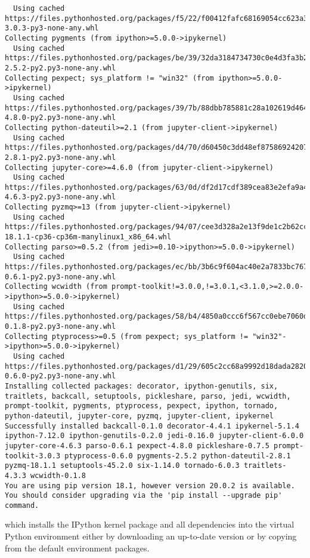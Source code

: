 \begin{verbatim}
  Using cached https://files.pythonhosted.org/packages/f5/22/f00412fafc68169054cc623a35c32773f22b403ddbe516c8adfdecf25341/prompt_toolkit-3.0.3-py3-none-any.whl
Collecting pygments (from ipython>=5.0.0->ipykernel)
  Using cached https://files.pythonhosted.org/packages/be/39/32da3184734730c0e4d3fa3b2b5872104668ad6dc1b5a73d8e477e5fe967/Pygments-2.5.2-py2.py3-none-any.whl
Collecting pexpect; sys_platform != "win32" (from ipython>=5.0.0->ipykernel)
  Using cached https://files.pythonhosted.org/packages/39/7b/88dbb785881c28a102619d46423cb853b46dbccc70d3ac362d99773a78ce/pexpect-4.8.0-py2.py3-none-any.whl
Collecting python-dateutil>=2.1 (from jupyter-client->ipykernel)
  Using cached https://files.pythonhosted.org/packages/d4/70/d60450c3dd48ef87586924207ae8907090de0b306af2bce5d134d78615cb/python_dateutil-2.8.1-py2.py3-none-any.whl
Collecting jupyter-core>=4.6.0 (from jupyter-client->ipykernel)
  Using cached https://files.pythonhosted.org/packages/63/0d/df2d17cdf389cea83e2efa9a4d32f7d527ba78667e0153a8e676e957b2f7/jupyter_core-4.6.3-py2.py3-none-any.whl
Collecting pyzmq>=13 (from jupyter-client->ipykernel)
  Using cached https://files.pythonhosted.org/packages/94/07/cee3d328a2e13f9de1c2b62cced7a389b61ac81424f2e377f3dc9d668282/pyzmq-18.1.1-cp36-cp36m-manylinux1_x86_64.whl
Collecting parso>=0.5.2 (from jedi>=0.10->ipython>=5.0.0->ipykernel)
  Using cached https://files.pythonhosted.org/packages/ec/bb/3b6c9f604ac40e2a7833bc767bd084035f12febcbd2b62204c5bc30edf97/parso-0.6.1-py2.py3-none-any.whl
Collecting wcwidth (from prompt-toolkit!=3.0.0,!=3.0.1,<3.1.0,>=2.0.0->ipython>=5.0.0->ipykernel)
  Using cached https://files.pythonhosted.org/packages/58/b4/4850a0ccc6f567cc0ebe7060d20ffd4258b8210efadc259da62dc6ed9c65/wcwidth-0.1.8-py2.py3-none-any.whl
Collecting ptyprocess>=0.5 (from pexpect; sys_platform != "win32"->ipython>=5.0.0->ipykernel)
  Using cached https://files.pythonhosted.org/packages/d1/29/605c2cc68a9992d18dada28206eeada56ea4bd07a239669da41674648b6f/ptyprocess-0.6.0-py2.py3-none-any.whl
Installing collected packages: decorator, ipython-genutils, six, traitlets, backcall, setuptools, pickleshare, parso, jedi, wcwidth, prompt-toolkit, pygments, ptyprocess, pexpect, ipython, tornado, python-dateutil, jupyter-core, pyzmq, jupyter-client, ipykernel
Successfully installed backcall-0.1.0 decorator-4.4.1 ipykernel-5.1.4 ipython-7.12.0 ipython-genutils-0.2.0 jedi-0.16.0 jupyter-client-6.0.0 jupyter-core-4.6.3 parso-0.6.1 pexpect-4.8.0 pickleshare-0.7.5 prompt-toolkit-3.0.3 ptyprocess-0.6.0 pygments-2.5.2 python-dateutil-2.8.1 pyzmq-18.1.1 setuptools-45.2.0 six-1.14.0 tornado-6.0.3 traitlets-4.3.3 wcwidth-0.1.8
You are using pip version 18.1, however version 20.0.2 is available.
You should consider upgrading via the 'pip install --upgrade pip' command.
\end{verbatim}
%
which installs the IPython kernel package and all dependencies into the virtual Python environment either by downloading an up-to-date version or by copying from the default environment packages.

